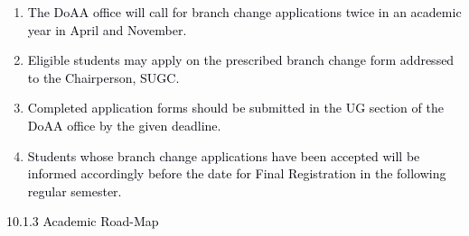\documentclass[12pt]{article}
\begin{document}
\vspace{\baselineskip}
\begin{enumerate}
	\item {\fontsize{10pt}{12.0pt}\selectfont \textcolor[HTML]{00000A}{The DoAA office will call for branch change applications twice in an academic year in April and November.}\par}\par


\vspace{\baselineskip}
	\item {\fontsize{10pt}{12.0pt}\selectfont \textcolor[HTML]{00000A}{Eligible students may apply on the prescribed branch change form addressed to the Chairperson, SUGC.}\par}\par


\vspace{\baselineskip}
	\item {\fontsize{10pt}{12.0pt}\selectfont \textcolor[HTML]{00000A}{Completed application forms should be submitted in the UG section of the DoAA office by the given deadline.}\par}\par


\vspace{\baselineskip}
	\item {\fontsize{10pt}{12.0pt}\selectfont \textcolor[HTML]{00000A}{Students whose branch change applications have been accepted will be informed accordingly before the date for Final Registration in the following regular semester.}\par}
\end{enumerate}\par


\vspace{\baselineskip}

\vspace{\baselineskip}
{\fontsize{10pt}{12.0pt}\selectfont \textcolor[HTML]{00000A}{10.1.3 Academic Road-Map}\par}\par
\end{document}
